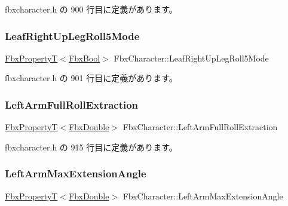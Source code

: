  fbxcharacter.\+h の 900 行目に定義があります。

\mbox{\label{class_fbx_character_aeed7584d8c5086b9b3deff24abd30b14}} 
\subsubsection{\texorpdfstring{Leaf\+Right\+Up\+Leg\+Roll5\+Mode}{LeafRightUpLegRoll5Mode}}
{\footnotesize\ttfamily \hyperlink{class_fbx_property_t}{Fbx\+PropertyT}$<$\hyperlink{fbxtypes_8h_a92e0562b2fe33e76a242f498b362262e}{Fbx\+Bool}$>$ Fbx\+Character\+::\+Leaf\+Right\+Up\+Leg\+Roll5\+Mode}



 fbxcharacter.\+h の 901 行目に定義があります。

\mbox{\label{class_fbx_character_ad569d30e14b20028b2b34c4e8b3a3374}} 
\subsubsection{\texorpdfstring{Left\+Arm\+Full\+Roll\+Extraction}{LeftArmFullRollExtraction}}
{\footnotesize\ttfamily \hyperlink{class_fbx_property_t}{Fbx\+PropertyT}$<$\hyperlink{fbxtypes_8h_a171e72a1c46fc15c1a6c9c31948c1c5b}{Fbx\+Double}$>$ Fbx\+Character\+::\+Left\+Arm\+Full\+Roll\+Extraction}



 fbxcharacter.\+h の 915 行目に定義があります。

\mbox{\label{class_fbx_character_a3b59fc1810376b0ace4d4489f1defd5e}} 
\subsubsection{\texorpdfstring{Left\+Arm\+Max\+Extension\+Angle}{LeftArmMaxExtensionAngle}}
{\footnotesize\ttfamily \hyperlink{class_fbx_property_t}{Fbx\+PropertyT}$<$\hyperlink{fbxtypes_8h_a171e72a1c46fc15c1a6c9c31948c1c5b}{Fbx\+Double}$>$ Fbx\+Character\+::\+Left\+Arm\+Max\+Extension\+Angle}



